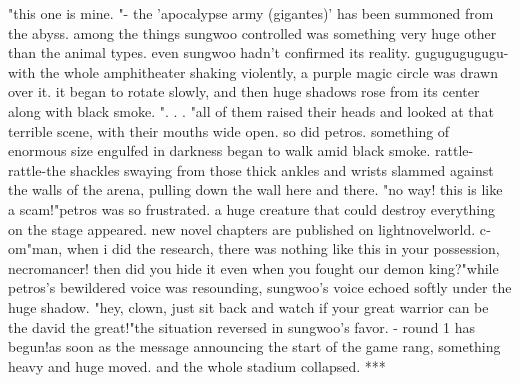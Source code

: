 "this one is mine.
"- the 'apocalypse army (gigantes)' has been summoned from the abyss.
among the things sungwoo controlled was something very huge other than the animal types.
 even sungwoo hadn't confirmed its reality.
gugugugugugu-with the whole amphitheater shaking violently, a purple magic circle was drawn over it.
it began to rotate slowly, and then huge shadows rose from its center along with black smoke.
".
.
.
"all of them raised their heads and looked at that terrible scene, with their mouths wide open.
 so did petros.
 something of enormous size engulfed in darkness began to walk amid black smoke.
rattle- rattle-the shackles swaying from those thick ankles and wrists slammed against the walls of the arena, pulling down the wall here and there.
"no way! this is like a scam!"petros was so frustrated.
 a huge creature that could destroy everything on the stage appeared.
new novel chapters are published on lightnovelworld.
c­om"man, when i did the research, there was nothing like this in your possession, necromancer! then did you hide it even when you fought our demon king?"while petros's bewildered voice was resounding, sungwoo's voice echoed softly under the huge shadow.
"hey, clown, just sit back and watch if your great warrior can be the david the great!"the situation reversed in sungwoo's favor.
- round 1 has begun!as soon as the message announcing the start of the game rang, something heavy and huge moved.
 and the whole stadium collapsed.
***

